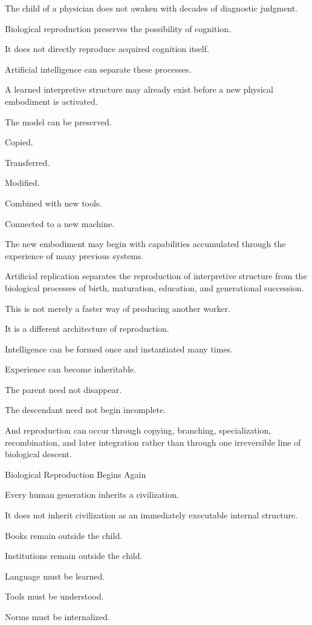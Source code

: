 The child of a physician does not awaken with decades of diagnostic judgment.

Biological reproduction preserves the possibility of cognition.

It does not directly reproduce acquired cognition itself.

Artificial intelligence can separate these processes.

A learned interpretive structure may already exist before a new physical embodiment is activated.

The model can be preserved.

Copied.

Transferred.

Modified.

Combined with new tools.

Connected to a new machine.

The new embodiment may begin with capabilities accumulated through the experience of many previous systems.

Artificial replication separates the reproduction of interpretive structure from the biological processes of birth, maturation, education, and generational succession.

This is not merely a faster way of producing another worker.

It is a different architecture of reproduction.

Intelligence can be formed once and instantiated many times.

Experience can become inheritable.

The parent need not disappear.

The descendant need not begin incomplete.

And reproduction can occur through copying, branching, specialization, recombination, and later integration rather than through one irreversible line of biological descent.

Biological Reproduction Begins Again

Every human generation inherits a civilization.

It does not inherit civilization as an immediately executable internal structure.

Books remain outside the child.

Institutions remain outside the child.

Language must be learned.

Tools must be understood.

Norms must be internalized.

